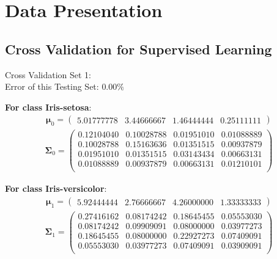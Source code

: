 \documentclass[11pt,a4paper]{article}
\newcommand{\htab}{\hspace*{0.63cm}}
\newcommand{\bs}[1]{\boldsymbol{#1}}
\begin{document}
\section{Data Presentation}
\hypertarget{cv}{}
\subsection{Cross Validation for Supervised Learning}

Cross Validation Set 1: \\
\htab Error of this Testing Set: $0.00\%$ 

\textbf{For class Iris-setosa}:
\begin{align} \bs{\mu}_{0} = \begin{pmatrix} 
5.01777778 & 3.44666667 & 1.46444444 & 0.25111111 
 \end{pmatrix}  \end{align} 
\vspace{-1cm}
\begin{align} \bs{\Sigma}_{0} = \begin{pmatrix} 
0.12104040 & 0.10028788 & 0.01951010 & 0.01088889 \\ 
0.10028788 & 0.15163636 & 0.01351515 & 0.00937879 \\ 
0.01951010 & 0.01351515 & 0.03143434 & 0.00663131 \\ 
0.01088889 & 0.00937879 & 0.00663131 & 0.01210101 \\ 
\end{pmatrix} \end{align}

\textbf{For class Iris-versicolor}:
\begin{align} \bs{\mu}_{1} = \begin{pmatrix} 
5.92444444 & 2.76666667 & 4.26000000 & 1.33333333 
 \end{pmatrix}  \end{align} 
\vspace{-1cm}
\begin{align} \bs{\Sigma}_{1} = \begin{pmatrix} 
0.27416162 & 0.08174242 & 0.18645455 & 0.05553030 \\ 
0.08174242 & 0.09909091 & 0.08000000 & 0.03977273 \\ 
0.18645455 & 0.08000000 & 0.22927273 & 0.07409091 \\ 
0.05553030 & 0.03977273 & 0.07409091 & 0.03909091 \\ 
\end{pmatrix} \end{align}
\end{document}
